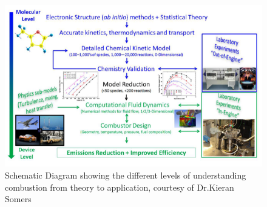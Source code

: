 \begin{figure}

\centering
\includegraphics[scale=0.5, keepaspectratio]{images/combustion_schematic.png}
\caption{Schematic Diagram showing the different levels of understanding combustion from theory to application, courtesy of Dr.Kieran Somers \cite{Curran2019DevelopingCombustion}}
\label{fig:combustion_schematic}
\end{figure}


